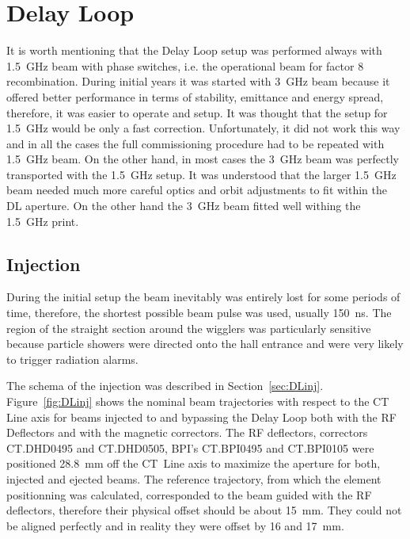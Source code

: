 \section{Delay Loop}

It is worth mentioning that the Delay Loop setup was performed always 
with 1.5~GHz beam with phase switches, i.e. the operational beam for 
factor 8 recombination. During initial years it was
started with 3~GHz beam because it offered better performance in terms
of stability, emittance and energy spread, therefore, it was easier to operate and setup.
It was thought that the setup for 1.5~GHz would be only a fast correction.
Unfortunately, it did not work this way and in all the cases the full commissioning
procedure had to be repeated with 1.5~GHz beam. On the other hand, in most cases the 3~GHz beam
was perfectly transported with the 1.5~GHz setup. It was understood
that the larger 1.5~GHz beam needed much more careful optics and orbit adjustments to fit within the \ac{DL} aperture. 
On the other hand the 3~GHz 
beam fitted well withing the 1.5~GHz print. 


\subsection{Injection}

During the initial setup the beam inevitably was entirely lost 
for some periods of time, therefore, the shortest possible beam pulse was used, 
usually 150~ns. The region of the straight section around the wigglers 
was particularly sensitive because particle showers were directed onto 
the hall entrance and were very likely to trigger radiation alarms.

The schema of the injection was described in Section~\ref{sec:DLinj}. 
Figure~\ref{fig:DLinj} shows the nominal beam trajectories with respect to the CT Line axis 
for beams injected to and bypassing the Delay Loop both 
with the RF Deflectors and with the magnetic correctors. 
The RF deflectors, correctors CT.DHD0495 and CT.DHD0505, BPI's CT.BPI0495 and CT.BPI0105 
were positioned 28.8~mm off the CT~Line axis to maximize the aperture for both, 
injected and ejected beams.
The reference trajectory, from which the element positionning was calculated, corresponded to
the beam guided with the RF deflectors, therefore their physical offset should be about 15~mm.
They could not be aligned perfectly and in reality they were offset by 16 and 17~mm.
 
